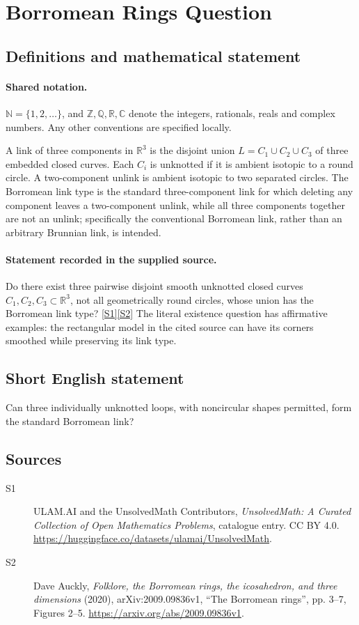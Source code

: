 \documentclass[11pt]{article}
\newcommand{\sref}[2]{\hyperlink{source:#1:#2}{[S#2]}}
\begin{document}
\section{Borromean Rings Question}\label{statement}

\subsection{Definitions and mathematical statement}

\paragraph{Shared notation.}$\mathbb N=\{1,2,\ldots\}$, and $\mathbb Z,\mathbb Q,\mathbb R,\mathbb C$ denote the integers, rationals, reals and complex numbers. Any other conventions are specified locally.


A link of three components in $\mathbb R^3$ is the disjoint union $L=C_1\cup C_2\cup C_3$ of three embedded closed curves. Each $C_i$ is unknotted if it is ambient isotopic to a round circle. A two-component unlink is ambient isotopic to two separated circles. The Borromean link type is the standard three-component link for which deleting any component leaves a two-component unlink, while all three components together are not an unlink; specifically the conventional Borromean link, rather than an arbitrary Brunnian link, is intended.
\paragraph{Statement recorded in the supplied source.}
Do there exist three pairwise disjoint smooth unknotted closed curves $C_1,C_2,C_3\subset\mathbb R^3$, not all geometrically round circles, whose union has the Borromean link type? \sref{statement}{1}\sref{statement}{2}
The literal existence question has affirmative examples: the rectangular model in the cited source can have its corners smoothed while preserving its link type.
\subsection{Short English statement}
Can three individually unknotted loops, with noncircular shapes permitted, form the standard Borromean link?
\subsection{Sources}
\begin{description}
\item[\hypertarget{source:statement:1}{S1}] ULAM.AI and the UnsolvedMath Contributors, \emph{UnsolvedMath: A Curated Collection of Open Mathematics Problems}, catalogue entry. CC BY 4.0. \url{https://huggingface.co/datasets/ulamai/UnsolvedMath}.
\item[\hypertarget{source:statement:2}{S2}] Dave Auckly, \emph{Folklore, the Borromean rings, the icosahedron, and three dimensions} (2020), arXiv:2009.09836v1, ``The Borromean rings'', pp. 3--7, Figures 2--5. \url{https://arxiv.org/abs/2009.09836v1}.
\end{description}
\label{end:statement}
\end{document}
